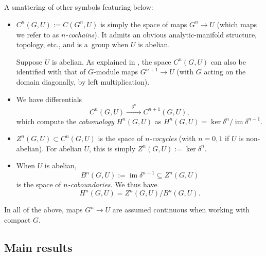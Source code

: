 \documentclass[pdftex]{sigma}
\numberwithin{equation}{section}
\DeclareMathOperator{\im}{\mathrm{im}}
\begin{document}
A smattering of other symbols featuring below:
\begin{itemize}\itemsep=0pt
\item $C^n(G,U):=C(G^n,U)$ is simply the space of maps $G^n\to U$ (which maps we refer to as {\it $n$-cochains}). It admits an obvious analytic-manifold structure, topology, etc., and is a~group when $U$ is abelian.

 Suppose $U$ is abelian. As explained in \cite[Section~VII.3]{ser-lf}, the space $C^n(G,U)$ can also be identified with that of $G$-module maps $G^{n+1}\to U$ (with $G$ acting on the domain diagonally, by left multiplication).
\item We have differentials
\[C^n(G,U)\xrightarrow{\quad\delta^n\quad}C^{n+1}(G,U),\] which compute the {\it cohomology} $H^n(G,U)$ as $
 H^n(G,U) = \ker \delta^n/\im \delta^{n-1}$.

\item $Z^n(G,U)\subset C^n(G,U)$ is the space of {\it $n$-cocycles} (with $n=0,1$ if $U$ is non-abelian). For abelian $U$, this is simply $Z^n(G,U):=\ker \delta^n$.
\item When $U$ is abelian,
 \begin{equation*}
 B^n(G,U):=\im\delta^{n-1}\subseteq Z^n(G,U)
 \end{equation*}
 is the space of {\it $n$-coboundaries}. We thus have
 \begin{equation*}
 H^n(G,U) = Z^n(G,U)/B^n(G,U).
 \end{equation*}
\end{itemize}
In all of the above, maps $G^n\to U$ are assumed continuous when working with compact $G$.

\subsection{Main results}\label{subse:gpmain}
\end{document}
